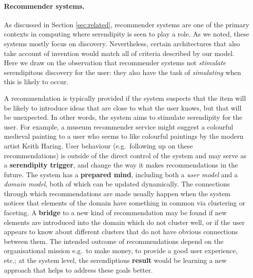 \paragraph{Recommender systems.} 

As discussed in Section \ref{sec:related}, recommender systems are one
of the primary contexts in computing where serendipity is seen to play
a role.  As we noted, these systems mostly focus on discovery.
Nevertheless, certain architectures that also take account of
invention would match all of criteria described by our model.  Here we
draw on the observation that recommender systems not \emph{stimulate}
serendipitous discovery for the user: they also have the task of
\emph{simulating} when this is likely to occur.

A recommendation is typically provided if the system suspects that the
item will be likely to introduce ideas that are close to what the user
knows, but that will be unexpected.  In other words, the system aims
to stimulate serendipity for the user. For example, a museum
recommender service might suggest a colourful medieval painting to a
user who seems to like colourful paintings by the modern artist Keith
Haring.  User behaviour (e.g.~following up on these recommendations)
is outside of the direct control of the system and may serve as a
\textbf{serendipity trigger}, and change the way it makes
recommendations in the future.  The system has a \textbf{prepared
  mind}, including both a \emph{user model} and a \emph{domain model},
both of which can be updated dynamically.  The connections through
which recommendations are made usually happen when the system notices
that elements of the domain have something in common via clustering or
faceting.  A \textbf{bridge} to a new kind of recommendation may be
found if new elements are introduced into the domain which do not
cluster well, or if the user appears to know about different clusters
that do not have obvious connections between them.  The intended
outcome of recommendations depend on the organisational mission
e.g.~to make money, to provide a good user experience, etc.; at the
system level, the serendiptious \textbf{result} would be learning a
new approach that helps to address these goals better.

